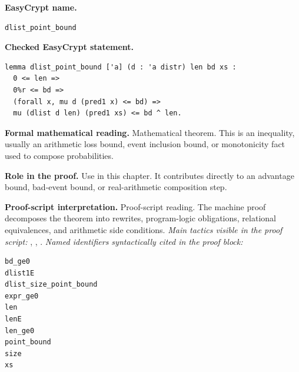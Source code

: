 \begin{formaltheorem}
\noindent\textbf{EasyCrypt name.}
\begin{lstlisting}[language=EasyCrypt,basicstyle=\ttfamily\scriptsize]
dlist_point_bound
\end{lstlisting}
\noindent\textbf{Checked EasyCrypt statement.}
\begin{lstlisting}[language=EasyCrypt,basicstyle=\ttfamily\scriptsize]
lemma dlist_point_bound ['a] (d : 'a distr) len bd xs :
  0 <= len =>
  0%r <= bd =>
  (forall x, mu d (pred1 x) <= bd) =>
  mu (dlist d len) (pred1 xs) <= bd ^ len.
\end{lstlisting}
\noindent\textbf{Formal mathematical reading.}
Mathematical theorem. This is an inequality, usually an arithmetic loss bound, event inclusion bound, or monotonicity fact used to compose probabilities.

\noindent\textbf{Role in the proof.}
Use in this chapter. It contributes directly to an advantage bound, bad-event bound, or real-arithmetic composition step.

\noindent\textbf{Proof-script interpretation.}
Proof-script reading. The machine proof decomposes the theorem into rewrites, program-logic obligations, relational equivalences, and arithmetic side conditions.
\emph{Main tactics visible in the proof script:} , , .
\emph{Named identifiers syntactically cited in the proof block:}
\begin{lstlisting}[language=EasyCrypt,basicstyle=\ttfamily\scriptsize]
bd_ge0
dlist1E
dlist_size_point_bound
expr_ge0
len
lenE
len_ge0
point_bound
size
xs
\end{lstlisting}

\end{formaltheorem}


